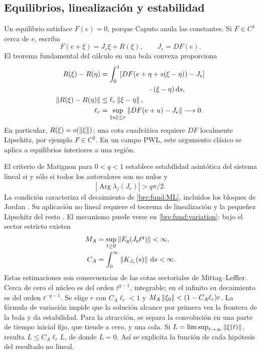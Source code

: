 \subsection{Equilibrios, linealización y estabilidad}

Un equilibrio satisface $F(e)=0$, porque Caputo anula las constantes.
Si $F\in C^1$ cerca de $e$, escriba
\begin{equation}
 F(e+\xi)=J_e\xi+R(\xi),\qquad J_e=DF(e).
 \label{bre:fund:linearization}
\end{equation}
El teorema fundamental del cálculo en una bola convexa proporciona
\begin{align}
 R(\xi)-R(\eta)
 &=\int_0^1[DF(e+\eta+s(\xi-\eta))-J_e]\nonumber\\
 &\hspace{24mm}\cdot(\xi-\eta)\dd s,\nonumber\\
 \norm{R(\xi)-R(\eta)}&\le\ell_r\norm{\xi-\eta},\nonumber\\
 \ell_r&=\sup_{\norm u\le r}\norm{DF(e+u)-J_e}\longrightarrow0.
 \label{bre:fund:smallremainder}
\end{align}
En particular, $R(\xi)=o(\left\lVert\xi\right\rVert)$; una cota cuadrática requiere
$DF$ localmente Lipschitz, por ejemplo $F\in C^2$. En un campo PWL,
este argumento clásico se aplica a equilibrios interiores a una región.

El criterio de Matignon para $0<q<1$ establece estabilidad asintótica del
sistema lineal si y sólo si todos los autovalores son no nulos y
\begin{equation}
 |\operatorname{Arg}\lambda_j(J_e)|>q\pi/2.
 \label{bre:fund:matignon}
\end{equation}
La condición caracteriza el decaimiento de \eqref{bre:fund:ML}, incluidos
los bloques de Jordan \cite{Matignon1996}. Su aplicación no lineal requiere
el teorema de linealización y la pequeñez Lipschitz del resto
\cite{CongDoanSiegmundTuan2016}. El mecanismo puede verse en
\eqref{bre:fund:variation}: bajo el sector estricto existen
\begin{align*}
 M_A&=\sup_{t\ge0}\left\lVert E_q(J_et^q)\right\rVert<\infty,\\
 C_A&=\int_0^\infty\left\lVert K_{J_e}(s)\right\rVert\,\mathrm d s<\infty.
\end{align*}
Estas estimaciones son consecuencias de las cotas sectoriales de
Mittag--Leffler. Cerca de cero el núcleo es del orden $t^{q-1}$,
integrable; en el infinito su decaimiento es del orden $t^{-q-1}$.
Se elige $r$ con $C_A\ell_r<1$ y
$M_A\left\lVert\xi_0\right\rVert<(1-C_A\ell_r)r$.
La fórmula de variación impide que la solución alcance por primera vez
la frontera de la bola y da estabilidad. Para la atracción, se separa
la convolución en una parte de tiempo inicial fijo, que tiende a cero,
y una cola. Si $L=\limsup_{t\to\infty}\left\lVert\xi(t)\right\rVert$, resulta
$L\le C_A\ell_rL$, de donde $L=0$.
Así se explicita la función de cada hipótesis del resultado no lineal.

